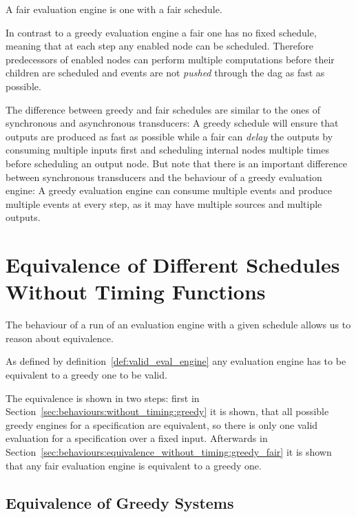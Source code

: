 \begin{definition}[name = Fair Evaluation Engines]\label{def:fair_evaluation_engines}
  A fair evaluation engine is one with a fair schedule.
\end{definition}

In contrast to a greedy evaluation engine a fair one has no fixed schedule, meaning that at each step any enabled node can be scheduled.
Therefore predecessors of enabled nodes can perform multiple computations before their children are scheduled and events are not \emph{pushed} through the \gls{dag} as fast as possible.

The difference between greedy and fair schedules are similar to the ones of synchronous and asynchronous transducers: A greedy schedule will ensure that outputs are produced as fast as possible while a fair can \emph{delay} the outputs by consuming multiple inputs first and scheduling internal nodes multiple times before scheduling an output node.
But note that there is an important difference between synchronous transducers and the behaviour of a greedy evaluation engine: A greedy evaluation engine can consume multiple events and produce multiple events at every step, as it may have multiple sources and multiple outputs.

\section{Equivalence of Different Schedules Without Timing Functions}
\label{sec:behaviours:equivalence_without_timing}

The behaviour of a run of an evaluation engine with a given schedule allows us to reason about equivalence.

As defined by definition~\ref{def:valid_eval_engine} any evaluation engine has to be equivalent to a greedy one to be valid.

The equivalence is shown in two steps: first in Section~\ref{sec:behaviours:without_timing:greedy} it is shown, that all possible greedy engines for a specification are equivalent, so there is only one valid evaluation for a specification over a fixed input.
Afterwards in Section~\ref{sec:behaviours:equivalence_without_timing:greedy_fair} it is shown that any fair evaluation engine is equivalent to a greedy one.


\subsection{Equivalence of Greedy Systems}
\label{sec:behaviours:equivalence_without_timing:greedy}

